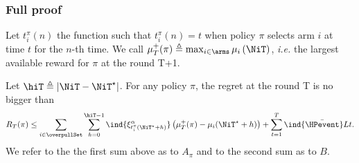 \subsubsection*{Full proof}
\label{ss:rested-proof}
Let $t_i^\pi(n)$ the function such that $t_i^\pi(n) = t$ when policy $\pi$ selects arm $i$ at time $t$ for the $n$-th time. We call $\mu_T^+(\pi) \triangleq \max_{i \in \arms} \mu_i\left(\NiT\right)$, \textit{i.e.} the largest available reward for $\pi$ at the round T+1.  
\begin{lemma}
\label{lem:regret-decompo}
 Let $\hiT \triangleq | \NiT - \NiT^{\star}|$. For any policy $\pi$, the regret at the round T is no bigger than
\begin{equation*}
R_T(\pi) \leq \sum_{i \in \overpullSet} \sum_{h=0}^{\hiT-1}\ind{\xi^\alpha_{t_i^\pi(\NiT^\star + h)} }\left(\mu^+_T(\pi) - \mu_i(\NiT^{\star} + h ) \right) + \sum_{t=1}^T \ind{\bar{\HPevent}}Lt.
\end{equation*}
We refer to the the first sum above as to $A_\pi$ and to the second sum as to $B$.
\end{lemma}
